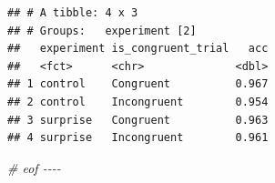 \documentclass[
]{article}
\newenvironment{Shaded}{\begin{snugshade}}{\end{snugshade}}
\newcommand{\CommentTok}[1]{\textcolor[rgb]{0.56,0.35,0.01}{\textit{#1}}}
\begin{document}
\begin{verbatim}
## # A tibble: 4 x 3
## # Groups:   experiment [2]
##   experiment is_congruent_trial   acc
##   <fct>      <chr>              <dbl>
## 1 control    Congruent          0.967
## 2 control    Incongruent        0.954
## 3 surprise   Congruent          0.963
## 4 surprise   Incongruent        0.961
\end{verbatim}

\begin{Shaded}
\begin{Highlighting}[]
\CommentTok{\# eof {-}{-}{-}{-}}
\end{Highlighting}
\end{Shaded}
\end{document}
